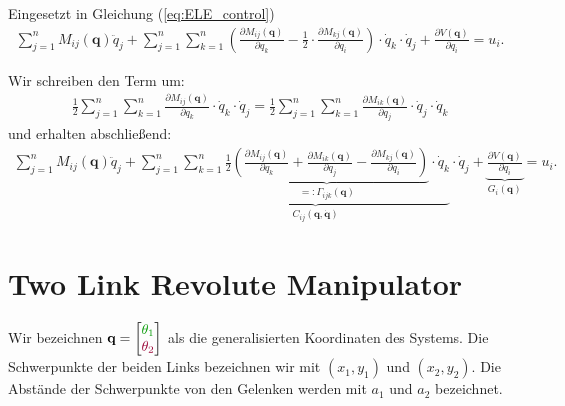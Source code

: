 \documentclass[a4paper, 12pt]{scrartcl}
\newcommand{\gruen}[2][gruen]{\textcolor{#1}{#2}}
\newcommand{\dunkelrot}[2][dunkelrot]{\textcolor{#1}{#2}}
\begin{document}
\begin{beweis}
    Eingesetzt in Gleichung (\ref{eq:ELE_control})
    \begin{align*}
        \sum_{j=1}^n M_{ij}(\bm{q}) \ddot{q}_j
        +
        \sum_{j=1}^{n}
        \sum_{k=1}^{n} 
        \left(
            \frac{\partial M_{ij}(\bm{q})}{\partial q_k} 
            -
            \frac{1}{2} 
            \cdot 
            \frac{\partial M_{kj}(\bm{q})}{\partial q_i} 
        \right)
        \cdot \dot{q}_k \cdot \dot{q}_j
        +
        \frac{\partial V(\bm{q})}{\partial q_i}
        =
        u_i.
    \end{align*}

    Wir schreiben den Term um:
    \begin{align*}
        \frac{1}{2}
        \sum_{j=1}^{n}
        \sum_{k=1}^{n} 
        \frac{\partial M_{ij}(\bm{q})}{\partial q_k} 
        \cdot \dot{q}_k \cdot \dot{q}_j
        =
        \frac{1}{2}
        \sum_{j=1}^{n}
        \sum_{k=1}^{n} 
        \frac{\partial M_{ik}(\bm{q})}{\partial q_j} 
        \cdot \dot{q}_j \cdot \dot{q}_k
    \end{align*}
    und erhalten abschließend:
    \begin{align*}
        \sum_{j=1}^n M_{ij}(\bm{q}) \ddot{q}_j
        +
        \sum_{j=1}^{n}
        \underbrace{
            \sum_{k=1}^{n} 
            \underbrace{
                \frac{1}{2} 
                \left(
                    \frac{\partial M_{ij}(\bm{q})}{\partial q_k} 
                    +
                    \frac{\partial M_{ik}(\bm{q})}{\partial q_j}
                    -
                    \frac{\partial M_{kj}(\bm{q})}{\partial q_i} 
                \right)
            }_{
                =: \Gamma_{ijk}(\bm{q})
            }
            \cdot \dot{q}_k 
        }_{
            C_{ij}(\bm{q},\bm{\dot{q}}) 
        }
        \cdot \dot{q}_j
        +
        \underbrace{
            \frac{\partial V(\bm{q})}{\partial q_i}
        }_{
            G_i(\bm{q})
        }
        =
        u_i.
    \end{align*}
\end{beweis}

\section{Two Link Revolute Manipulator}

Wir bezeichnen $\textbf{q} = 
\begin{bmatrix} \gruen{\theta_1} \\ \dunkelrot{\theta_2} \end{bmatrix}$ 
als die generalisierten Koordinaten des Systems. Die Schwerpunkte der beiden Links
bezeichnen wir mit $(x_1, y_1)$ und $(x_2, y_2)$. Die Abstände der Schwerpunkte
von den Gelenken werden mit $a_1$ und $a_2$ bezeichnet.
\end{document}
